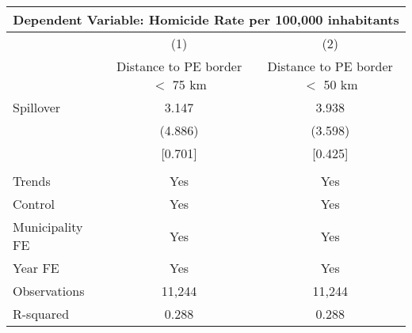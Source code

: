 \documentclass[]{article}
\begin{document}
\begin{table}[htbp]
\centering
\begin{threeparttable}
\begin{tabular}{lcc}
\toprule
\multicolumn{3}{c}{Dependent Variable: Homicide Rate per 100,000 inhabitants} \\
\midrule
 & (1) & (2) \\
 & Distance to PE border $<$ 75 km & Distance to PE border $<$ 50 km \\
\midrule
Spillover & 3.147 & 3.938 \\
 & (4.886) & (3.598) \\
 & [0.701] & [0.425] \\
 &  &  \\
 \midrule
Trends & Yes & Yes \\
Control & Yes & Yes \\
Municipality FE & Yes & Yes \\
Year FE & Yes & Yes \\
Observations & 11,244 & 11,244 \\
R-squared & 0.288 & 0.288 \\
\bottomrule
\end{tabular}
\end{threeparttable}
\end{table}
\end{document}
